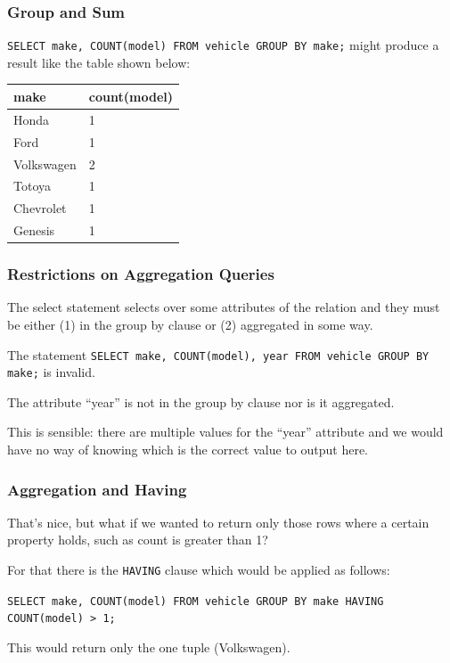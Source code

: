 \begin{frame}
\frametitle{Group and Sum}

\texttt{SELECT make, COUNT(model) FROM vehicle GROUP BY make;} might produce a result like the table shown below:

\begin{center}
\begin{tabular}{|l|l|}\hline
	\textbf{make} & \textbf{count(model)} \\ \hline
	Honda & 1  \\ \hline
	Ford & 1  \\ \hline
	Volkswagen & 2  \\ \hline
	Totoya & 1  \\ \hline
	Chevrolet & 1  \\ \hline
	Genesis & 1  \\ \hline
\end{tabular}
\end{center}

\end{frame}



\begin{frame}
\frametitle{Restrictions on Aggregation Queries}

The select statement selects over some attributes of the relation and they must be either (1) in the group by clause or (2) aggregated in some way. 

The statement \texttt{SELECT make, COUNT(model), year FROM vehicle GROUP BY make;} is invalid.

The attribute ``year'' is not in the group by clause nor is it aggregated. 

This is sensible: there are multiple values for the ``year'' attribute and we would have no way of knowing which is the correct value to output here.

\end{frame}


\begin{frame}
\frametitle{Aggregation and Having}

That's nice, but what if we wanted to return only those rows where a certain property holds, such as count is greater than 1? 

For that there is the \texttt{HAVING} clause which would be applied as follows: 

\texttt{SELECT make, COUNT(model) FROM vehicle GROUP BY make HAVING COUNT(model) > 1;} 

This would return only the one tuple (Volkswagen).

\end{frame}



